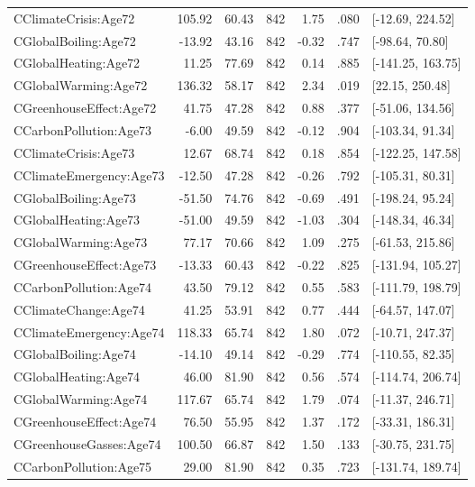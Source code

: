 \begin{table}[ht]
\begin{tabular}{lrrrrrl}
  CClimateCrisis:Age72 & 105.92 & 60.43 & 842 & 1.75 & .080 & [-12.69, 224.52] \\ 
  CGlobalBoiling:Age72 & -13.92 & 43.16 & 842 & -0.32 & .747 & [-98.64, 70.80] \\ 
  CGlobalHeating:Age72 & 11.25 & 77.69 & 842 & 0.14 & .885 & [-141.25, 163.75] \\ 
  CGlobalWarming:Age72 & 136.32 & 58.17 & 842 & 2.34 & .019 & [22.15, 250.48] \\ 
  CGreenhouseEffect:Age72 & 41.75 & 47.28 & 842 & 0.88 & .377 & [-51.06, 134.56] \\ 
  CCarbonPollution:Age73 & -6.00 & 49.59 & 842 & -0.12 & .904 & [-103.34, 91.34] \\ 
  CClimateCrisis:Age73 & 12.67 & 68.74 & 842 & 0.18 & .854 & [-122.25, 147.58] \\ 
  CClimateEmergency:Age73 & -12.50 & 47.28 & 842 & -0.26 & .792 & [-105.31, 80.31] \\ 
  CGlobalBoiling:Age73 & -51.50 & 74.76 & 842 & -0.69 & .491 & [-198.24, 95.24] \\ 
  CGlobalHeating:Age73 & -51.00 & 49.59 & 842 & -1.03 & .304 & [-148.34, 46.34] \\ 
  CGlobalWarming:Age73 & 77.17 & 70.66 & 842 & 1.09 & .275 & [-61.53, 215.86] \\ 
  CGreenhouseEffect:Age73 & -13.33 & 60.43 & 842 & -0.22 & .825 & [-131.94, 105.27] \\ 
  CCarbonPollution:Age74 & 43.50 & 79.12 & 842 & 0.55 & .583 & [-111.79, 198.79] \\ 
  CClimateChange:Age74 & 41.25 & 53.91 & 842 & 0.77 & .444 & [-64.57, 147.07] \\ 
  CClimateEmergency:Age74 & 118.33 & 65.74 & 842 & 1.80 & .072 & [-10.71, 247.37] \\ 
  CGlobalBoiling:Age74 & -14.10 & 49.14 & 842 & -0.29 & .774 & [-110.55, 82.35] \\ 
  CGlobalHeating:Age74 & 46.00 & 81.90 & 842 & 0.56 & .574 & [-114.74, 206.74] \\ 
  CGlobalWarming:Age74 & 117.67 & 65.74 & 842 & 1.79 & .074 & [-11.37, 246.71] \\ 
  CGreenhouseEffect:Age74 & 76.50 & 55.95 & 842 & 1.37 & .172 & [-33.31, 186.31] \\ 
  CGreenhouseGasses:Age74 & 100.50 & 66.87 & 842 & 1.50 & .133 & [-30.75, 231.75] \\ 
  CCarbonPollution:Age75 & 29.00 & 81.90 & 842 & 0.35 & .723 & [-131.74, 189.74] \\ 

\end{tabular}
\end{table}

